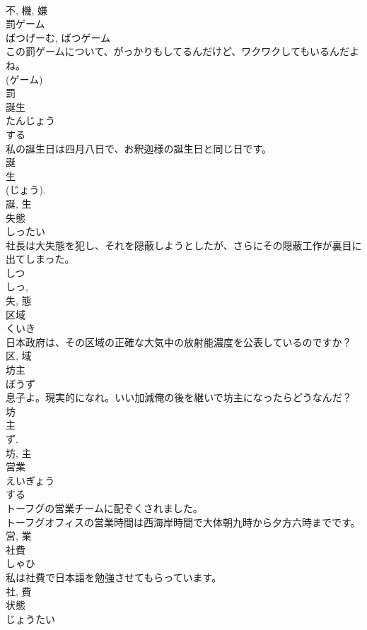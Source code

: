 \documentclass[8pt]{extreport}
\begin{document}
\begin{CJK}{UTF8}{min}
\\	不, 機, 嫌	
\\	罰ゲーム	
\\	ばつげーむ, ばつゲーム	
\\	この罰ゲームについて、がっかりもしてるんだけど、ワクワクしてもいるんだよね。	
\\	(ゲーム) 
\\	罰	
\\	誕生	
\\	たんじょう	
\\	する 
\\	私の誕生日は四月八日で、お釈迦様の誕生日と同じ日です。	
\\	誕 
\\	生 
\\	(じょう). 
\\	誕, 生	
\\	失態	
\\	しったい	
\\	社長は大失態を犯し、それを隠蔽しようとしたが、さらにその隠蔽工作が裏目に出てしまった。	
\\	しつ 
\\	しっ, 
\\	失, 態	
\\	区域	
\\	くいき	
\\	日本政府は、その区域の正確な大気中の放射能濃度を公表しているのですか？	
\\	区, 域	
\\	坊主	
\\	ぼうず	
\\	息子よ。現実的になれ。いい加減俺の後を継いで坊主になったらどうなんだ？	
\\	坊 
\\	主 
\\	ず. 
\\	坊, 主	
\\	営業	
\\	えいぎょう	
\\	する 
\\	トーフグの営業チームに配ぞくされました。	
\\	トーフグオフィスの営業時間は西海岸時間で大体朝九時から夕方六時までです。	
\\	営, 業	
\\	社費	
\\	しゃひ	
\\	私は社費で日本語を勉強させてもらっています。	
\\	社, 費	
\\	状態	
\\	じょうたい	

\end{CJK}
\end{document}
